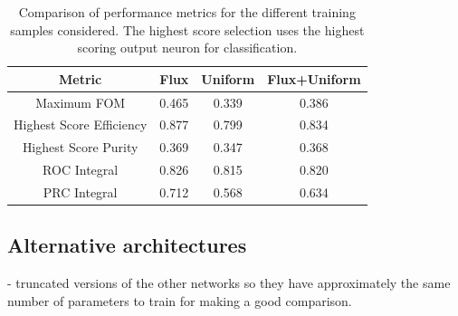 \begin{table}
    \begin{tabular}{cccc}
        Metric                   & Flux  & Uniform & Flux+Uniform \\
        \midrule
        Maximum FOM              & 0.465 & 0.339   & 0.386        \\
        Highest Score Efficiency & 0.877 & 0.799   & 0.834        \\
        Highest Score Purity     & 0.369 & 0.347   & 0.368        \\
        ROC Integral             & 0.826 & 0.815   & 0.820        \\
        PRC Integral             & 0.712 & 0.568   & 0.634        \\
    \end{tabular}
    \caption[Comparison of performance metrics for the different training samples considered.]
    {Comparison of performance metrics for the different training samples considered. The highest
        score selection uses the highest scoring output neuron for classification.}
    \label{tab:sample}
\end{table}

\subsection{Alternative architectures} %
\label{sec:results_alt_arch} %

- truncated versions of the other networks so they have approximately the same number of
parameters to train for making a good comparison.

